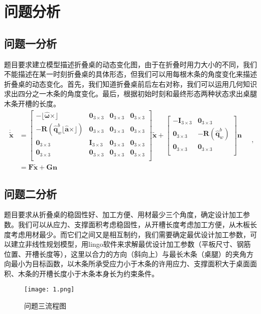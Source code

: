 \documentclass[bwprint]{gmcmthesis}
\begin{document}
\section{问题分析}

\subsection{问题一分析}
题目要求建立模型描述折叠桌的动态变化图，由于在折叠时用力大小的不同，我们不能描述在某一时刻折叠桌的具体形态，但我们可以用每根木条的角度变化来描述折叠桌的动态变化。首先，我们知道折叠桌前后左右对称，我们可以运用几何知识求出四分之一木条的角度变化。最后，根据初始时刻和最终形态两种状态求出桌腿木条开槽的长度。
\begin{equation}
	\begin{aligned}
		\dot{\tilde{\mathbf{x}}}&=\left[ \begin{matrix}
			-\lfloor \boldsymbol{\hat{\omega}}\times \rfloor&		\mathbf{0}_{3\times 3}&		\mathbf{0}_{3\times 3}&		\mathbf{0}_{3\times 3}\\
			-\mathbf{R}\left( \hat{\mathbf{q}}_{w}^{b}\lfloor \hat{\mathbf{a}}\times \rfloor \right)&		\mathbf{0}_{3\times 3}&		\mathbf{0}_{3\times 3}&		\mathbf{0}_{3\times 3}\\
			\mathbf{0}_{3\times 3}&		\mathbf{I}_{3\times 3}&		\mathbf{0}_{3\times 3}&		\mathbf{0}_{3\times 3}\\
			\mathbf{0}_{3\times 3}&		\mathbf{0}_{3\times 3}&		\mathbf{0}_{3\times 3}&		\mathbf{0}_{3\times 3}\\
		\end{matrix} \right] \tilde{\mathbf{x}}+\left[ \begin{matrix}
			-\mathbf{I}_{3\times 3}&		\mathbf{0}_{3\times 3}\\
			\mathbf{0}_{3\times 3}&		-\mathbf{R}\left( \hat{\mathbf{q}}_{w}^{b} \right)\\
			\mathbf{0}_{3\times 3}&		\mathbf{0}_{3\times 3}\\
		\end{matrix} \right] \mathbf{n}
		\\
		&=\mathbf{F}\tilde{\mathbf{x}}+\mathbf{Gn}
	\end{aligned}  \quad ,
\end{equation}


\subsection{问题二分析}
题目要求从折叠桌的稳固性好、加工方便、用材最少三个角度，确定设计加工参数。我们可以从应力、支撑面积考虑稳固性，从开槽长度考虑加工方便，从木板长度考虑用材最少。而它们之间又是相互制约，我们需要确定最优设计加工参数，可以建立非线性规划模型，用lingo软件来求解最优设计加工参数（平板尺寸、钢筋位置、开槽长度等），这里以合力的方向（斜向上）与最长木条（桌腿）的夹角方向最小为目标函数，以木条所承受应力小于木条的许用应力、支撑面积大于桌面面积、木条的开槽长度小于木条本身长为约束条件。
\begin{figure}[!h]
\centering
\texttt{[image: 1.png]}
\caption{问题三流程图}
\end{figure}
\end{document}
